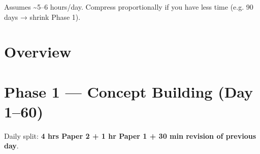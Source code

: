 
Assumes \textasciitilde5--6 hours/day. Compress proportionally if you have less time (e.g. 90 days → shrink Phase 1).

\needspace{95pt}

\hypertarget{rev-plan--overview}{%
\section{Overview}\label{rev-plan--overview}}



\needspace{160pt}

\hypertarget{rev-plan--phase-1--concept-building-day-160}{%
\section{Phase 1 --- Concept Building (Day 1--60)}\label{rev-plan--phase-1--concept-building-day-160}}

Daily split: \textbf{4 hrs Paper 2 + 1 hr Paper 1 + 30 min revision of previous day}.

\begingroup\small

